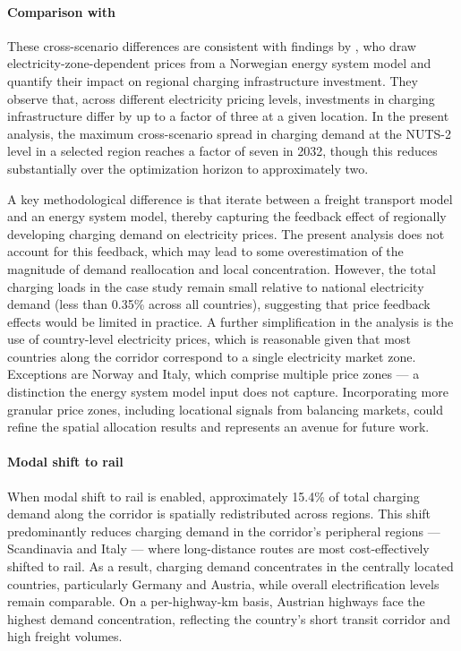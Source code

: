     \paragraph*{Comparison with \citet{PAGNIER2026105114}} These cross-scenario differences are consistent with findings by \citet{PAGNIER2026105114}, who draw electricity-zone-dependent prices from a Norwegian energy system model and quantify their impact on regional charging infrastructure investment. They observe that, across different electricity pricing levels, investments in charging infrastructure differ by up to a factor of three at a given location. In the present analysis, the maximum cross-scenario spread in charging demand at the NUTS-2 level in a selected region reaches a factor of seven in 2032, though this reduces substantially over the optimization horizon to approximately two. 

   A key methodological difference is that \citet{PAGNIER2026105114} iterate between a freight transport model and an energy system model, thereby capturing the feedback effect of regionally developing charging demand on electricity prices. The present analysis does not account for this feedback, which may lead to some overestimation of the magnitude of demand reallocation and local concentration. However, the total charging loads in the case study remain small relative to national electricity demand (less than 0.35\% across all countries), suggesting that price feedback effects would be limited in practice. A further simplification in the analysis is the use of country-level electricity prices, which is reasonable given that most countries along the corridor correspond to a single electricity market zone. Exceptions are Norway and Italy, which comprise multiple price zones — a distinction the energy system model input does not capture. Incorporating more granular price zones, including locational signals from balancing markets, could refine the spatial allocation results and represents an avenue for future work.
    
    

    \paragraph*{Modal shift to rail} When modal shift to rail is enabled, approximately 15.4\% of total charging demand along the corridor is spatially redistributed across regions. This shift predominantly reduces charging demand in the corridor's peripheral regions — Scandinavia and Italy — where long-distance routes are most cost-effectively shifted to rail. As a result, charging demand concentrates in the centrally located countries, particularly Germany and Austria, while overall electrification levels remain comparable. On a per-highway-km basis, Austrian highways face the highest demand concentration, reflecting the country's short transit corridor and high freight volumes.


